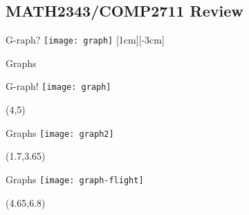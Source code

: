 \documentclass[xcolor={dvipsnames}]{beamer}
\begin{document}
\subsection{MATH2343/COMP2711 Review}
\begin{frame}{G-raph?}
    \centering
    \texttt{[image: graph]}
    [1cm][-3cm]
\end{frame}
\begin{frame}{Graphs}
\end{frame}
\begin{frame}{G-raph!}
    \centering
    \texttt{[image: graph]}
    \begin{textblock}{5}(4,5)
    \end{textblock}
\end{frame}
\begin{frame}{Graphs}
    \centering
    \texttt{[image: graph2]}
    \begin{textblock}{5}(1.7,3.65)
    \end{textblock}
\end{frame}
\begin{frame}{Graphs}
    \centering
    \texttt{[image: graph-flight]}
    \begin{textblock}{5}(4.65,6.8)
    \end{textblock}
\end{frame}
\end{document}
